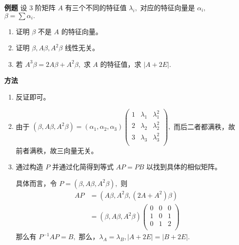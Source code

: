 \begin{enumerate}
    \item[\textbf{例题}]
    设 $ 3 $ 阶矩阵 $ A $ 有三个不同的特征值 $ \lambda_i, $ 对应的特征向量是 $ \alpha_i, $ 
    $ \beta = \sum \alpha_i. $ 
    \begin{enumerate}
        \item 证明 $ \beta $ 不是 $ A $ 的特征向量。
        \item 证明 $ \beta,A\beta,A^2\beta $ 线性无关。
        \item 若 $ A^3\beta = 2A\beta + A^2\beta, $ 求 $ A $ 的特征值，求 $ |A+2E|. $ 
    \end{enumerate}
    \item[\textbf{方法}]
    \begin{enumerate}
        \item 反证即可。
        \item 
        由于 $ (\beta,A\beta,A^2\beta) = (\alpha_1,\alpha_2,\alpha_3)
        \begin{pmatrix}
            1 & \lambda_1 & \lambda_1^2\\
            2 & \lambda_2 & \lambda_2^2\\
            3 & \lambda_3 & \lambda_3^2\\
        \end{pmatrix}, $ 而后二者都满秩，故前者满秩，故三向量无关。
        \item 通过构造 $ P $ 并通过化简得到等式 $ AP = PB $ 以找到具体的相似矩阵。
        
        具体而言，令 $ P = (\beta,A\beta,A^2\beta), $ 则
        \begin{equation*}
            \begin{aligned}
                AP &= (A\beta,A^2\beta,(2A+A^2)\beta)\\ 
                &= (\beta,A\beta,A^2\beta)\begin{pmatrix}
                    0&0&0\\
                    1&0&1\\
                    0&1&2\\
                \end{pmatrix}
            \end{aligned}
        \end{equation*}
        那么有 $ P^{-1}AP = B, $ 那么，$ \lambda_A = \lambda_B, |A+2E| = |B+2E|. $ 
    \end{enumerate}
\end{enumerate}

